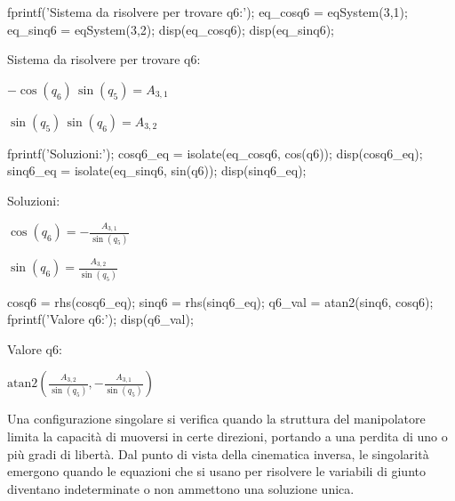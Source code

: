 \documentclass[11pt, a4paper]{article}
\begin{document}
\begin{matlabcode}
fprintf('Sistema da risolvere per trovare q6:');
eq_cosq6 = eqSystem(3,1);
eq_sinq6 = eqSystem(3,2);
disp(eq_cosq6);
disp(eq_sinq6);
\end{matlabcode}
\begin{matlaboutput}
Sistema da risolvere per trovare q6:
\end{matlaboutput}
\begin{matlabsymbolicoutput}
$\displaystyle -\cos \left(q_6 \right)\,\sin \left(q_5 \right)=A_{3,1} $
\end{matlabsymbolicoutput}
\begin{matlabsymbolicoutput}
$\displaystyle \sin \left(q_5 \right)\,\sin \left(q_6 \right)=A_{3,2} $
\end{matlabsymbolicoutput}
\newpage
\begin{matlabcode}
fprintf('Soluzioni:');
cosq6_eq = isolate(eq_cosq6, cos(q6));
disp(cosq6_eq);
sinq6_eq = isolate(eq_sinq6, sin(q6));
disp(sinq6_eq);
\end{matlabcode}
\begin{matlaboutput}
Soluzioni:
\end{matlaboutput}
\begin{matlabsymbolicoutput}
$\displaystyle \cos \left(q_6 \right)=-\frac{A_{3,1} }{\sin \left(q_5 \right)}$
\end{matlabsymbolicoutput}
\begin{matlabsymbolicoutput}
$\displaystyle \sin \left(q_6 \right)=\frac{A_{3,2} }{\sin \left(q_5 \right)}$
\end{matlabsymbolicoutput}
\begin{matlabcode}
cosq6 = rhs(cosq6_eq);
sinq6 = rhs(sinq6_eq);
q6_val = atan2(sinq6, cosq6);
fprintf('Valore q6:');
disp(q6_val);
\end{matlabcode}
\begin{matlaboutput}
Valore q6:
\end{matlaboutput}
\begin{matlabsymbolicoutput}
$\displaystyle \textrm{atan2}\left(\frac{A_{3,2} }{\sin \left(q_5 \right)},-\frac{A_{3,1} }{\sin \left(q_5 \right)}\right)$
\end{matlabsymbolicoutput}


\begin{par}
\begin{flushleft}
Una configurazione singolare si verifica quando la struttura del manipolatore limita la capacità di muoversi in certe direzioni, portando a una perdita di uno o più gradi di libertà. Dal punto di vista della cinematica inversa, le singolarità emergono quando le equazioni che si usano per risolvere le variabili di giunto diventano indeterminate o non ammettono una soluzione unica.
\end{flushleft}
\end{par}
\end{document}

